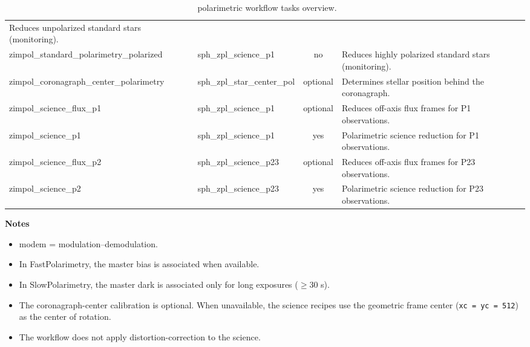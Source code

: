 \begin{table}[htbp]
\begin{tabular}{|l|l|c|p{7cm}|}
Reduces unpolarized standard stars (monitoring). \\
zimpol\_standard\_polarimetry\_polarized & sph\_zpl\_science\_p1 & no &
Reduces highly polarized standard stars (monitoring). \\
zimpol\_coronagraph\_center\_polarimetry & sph\_zpl\_star\_center\_pol & optional &
Determines stellar position behind the coronagraph. \\
zimpol\_science\_flux\_p1 & sph\_zpl\_science\_p1 & optional &
Reduces off-axis flux frames for P1 observations. \\
zimpol\_science\_p1 & sph\_zpl\_science\_p1 & yes &
Polarimetric science reduction for P1 observations. \\
zimpol\_science\_flux\_p2 & sph\_zpl\_science\_p23 & optional &
Reduces off-axis flux frames for P23 observations. \\
zimpol\_science\_p2 & sph\_zpl\_science\_p23 & yes &
Polarimetric science reduction for P23 observations. \\
\hline
\end{tabular}
\caption{\instname\ polarimetric workflow tasks overview.}
\label{tab:zimpol_polarimetry_tasks}
\end{table}


\textbf{Notes}

\begin{itemize}
\item modem = modulation--demodulation.
\item In FastPolarimetry, the master bias is associated when available.
\item In SlowPolarimetry, the master dark is associated only for long exposures ($\geq$30 s).
\item The coronagraph-center calibration is optional. When unavailable, the science recipes use the geometric frame center (\texttt{xc = yc = 512}) as the center of rotation.
\item The workflow does not apply distortion-correction to the science.
\end{itemize}